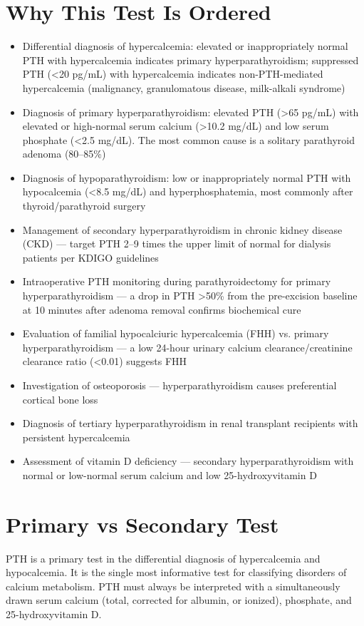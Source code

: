 \section*{Why This Test Is Ordered}
\begin{itemize}
  \item Differential diagnosis of hypercalcemia: elevated or inappropriately normal PTH with hypercalcemia indicates primary hyperparathyroidism; suppressed PTH (<20 pg/mL) with hypercalcemia indicates non-PTH-mediated hypercalcemia (malignancy, granulomatous disease, milk-alkali syndrome)
  \item Diagnosis of primary hyperparathyroidism: elevated PTH (>65 pg/mL) with elevated or high-normal serum calcium (>10.2 mg/dL) and low serum phosphate (<2.5 mg/dL). The most common cause is a solitary parathyroid adenoma (80--85\%)
  \item Diagnosis of hypoparathyroidism: low or inappropriately normal PTH with hypocalcemia (<8.5 mg/dL) and hyperphosphatemia, most commonly after thyroid/parathyroid surgery
  \item Management of secondary hyperparathyroidism in chronic kidney disease (CKD) --- target PTH 2--9 times the upper limit of normal for dialysis patients per KDIGO guidelines \cite{kdigo2017clinical}
  \item Intraoperative PTH monitoring during parathyroidectomy for primary hyperparathyroidism --- a drop in PTH >50\% from the pre-excision baseline at 10 minutes after adenoma removal confirms biochemical cure
  \item Evaluation of familial hypocalciuric hypercalcemia (FHH) vs. primary hyperparathyroidism --- a low 24-hour urinary calcium clearance/creatinine clearance ratio (<0.01) suggests FHH
  \item Investigation of osteoporosis --- hyperparathyroidism causes preferential cortical bone loss
  \item Diagnosis of tertiary hyperparathyroidism in renal transplant recipients with persistent hypercalcemia
  \item Assessment of vitamin D deficiency --- secondary hyperparathyroidism with normal or low-normal serum calcium and low 25-hydroxyvitamin D
\end{itemize}

\section*{Primary vs Secondary Test}
PTH is a primary test in the differential diagnosis of hypercalcemia and hypocalcemia. It is the single most informative test for classifying disorders of calcium metabolism. PTH must always be interpreted with a simultaneously drawn serum calcium (total, corrected for albumin, or ionized), phosphate, and 25-hydroxyvitamin D.

